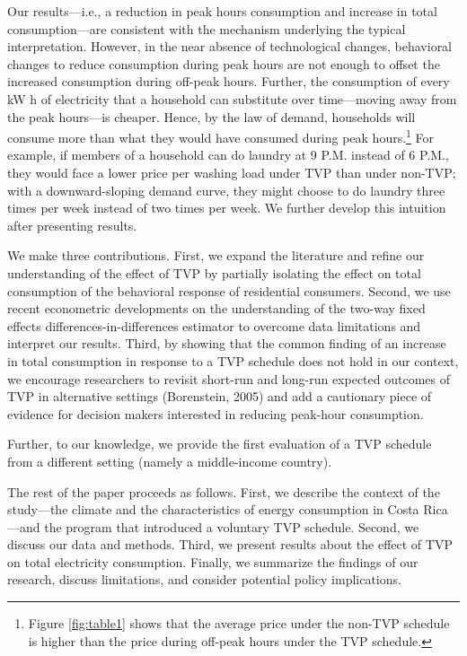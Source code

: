 \documentclass[12pt]{article}
\begin{document}
\sloppy Our results---i.e., a reduction in peak hours consumption and increase in total consumption---are consistent with the mechanism underlying the typical interpretation. However, in the near absence of technological changes, behavioral changes to reduce consumption during peak hours are not enough to offset the increased consumption during off-peak hours. Further, the consumption of every kW h of electricity that a household can substitute over time---moving away from the peak hours---is cheaper. Hence, by the law of demand, households will consume more than what they would have consumed during peak hours.\footnote{Figure \ref{fig:table1} shows that the average price under the non-TVP schedule is higher than the price during off-peak hours under the TVP schedule.} For example, if members of a household can do laundry at 9 P.M. instead of 6 P.M., they would face a lower price per washing load under TVP than under non-TVP; with a downward-sloping demand curve, they might choose to do laundry three times per week instead of two times per week. We further develop this intuition after presenting results.

We make three contributions. First, we expand the literature and refine our understanding of the effect of TVP by partially isolating the effect on total consumption of the behavioral response of residential consumers. Second, we use recent econometric developments on the understanding of the two-way fixed effects differences-in-differences estimator to overcome data limitations and interpret our results. Third, by showing that the common finding of an increase in total consumption in response to a TVP schedule does not hold in our context, we encourage researchers to revisit short-run and long-run expected outcomes of TVP in alternative settings (Borenstein, 2005) and add a cautionary piece of evidence for decision makers interested in reducing peak-hour consumption.

Further, to our knowledge, we provide the first evaluation of a TVP schedule from a different setting (namely a middle-income country).






The rest of the paper proceeds as follows. First, we describe the context of the study---the climate and the characteristics of energy consumption in Costa Rica---and the program that introduced a voluntary TVP schedule. Second, we discuss our data and methods. Third, we present results about the effect of TVP on total electricity consumption. Finally, we summarize the findings of our research, discuss limitations, and consider potential policy implications.
\end{document}

